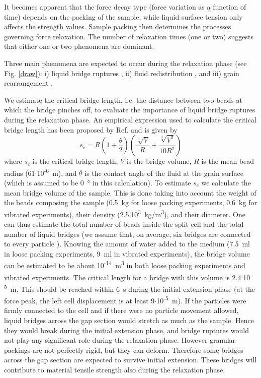 It becomes apparent that the force decay type (force variation as a function of time) depends on the packing of the sample, while liquid surface tension only affects the strength values. Sample packing then determines the processes governing force relaxation. The number of relaxation times (one or two) suggests that either one or two phenomena are dominant.

Three main phenomena are expected to occur during the relaxation phase (see Fig. \ref{draw}): i) liquid bridge ruptures \cite{Kohonen2004,Willett2000}, ii) fluid redistribution \cite{Herminghaus2005,Kohonen2004,Mani2015,Scheel2009,Scheel2008JP}, and iii) grain rearrangement \cite{Hartley2003,Utter2004}.

We estimate the critical bridge length, i.e. the distance between two beads at which the bridge pinches off, to evaluate the importance of liquid bridge ruptures during the relaxation phase. An empirical expression used to calculate the critical bridge length has been proposed by Ref. \cite{Willett2000} and is given by
\begin{equation}\label{sc}
\displaystyle s_c=R\left(1+\frac{\theta}{2}\right)\left(\frac{\sqrt[3]{V}}{R}+\frac{\sqrt[3]{V^2}}{10R^2}\right)
\end{equation}
where $s_c$ is the critical bridge length, $V$ is the bridge volume, $R$ is the mean bead radius (61$\cdot$10\textsuperscript{-6}~\si{\metre}), and $\theta$ is the contact angle of the fluid at the grain surface (which is assumed to be 0~\si{\degree} in this calculation). To estimate $s_c$ we calculate the mean bridge volume of the sample. This is done taking into account the weight of the beads composing the sample (0.5~\si{kg} for loose packing experiments, 0.6~\si{kg} for vibrated experiments), their density (2.5$\cdot$10\textsuperscript{3}~\si{kg/m^3}), and their diameter. One can thus estimate the total number of beads inside the split cell and the total number of liquid bridges (we assume that, on average, six bridges are connected to every particle \cite{Kohonen2004}). Knowing the amount of water added to the medium (7.5~\si{ml} in loose packing experiments, 9~\si{ml} in vibrated experiments), the bridge volume can be estimated to be about 10\textsuperscript{-14}~\si{m^3} in both loose packing experiments and vibrated experiments. The critical length for a bridge with this volume is 2.4$\cdot$10\textsuperscript{-5}~\si{\metre}. This should be reached within 6~\si{s} during the initial extension phase (at the force peak, the left cell displacement is at least 9$\cdot$10\textsuperscript{-5}~\si{\metre}). If the particles were firmly connected to the cell and if there were no particle movement allowed, liquid bridges across the gap section would stretch as much as the sample. Hence they would break during the initial extension phase, and bridge ruptures would not play any significant role during the relaxation phase. However granular packings are not perfectly rigid, but they can deform. Therefore some bridges across the gap section are expected to survive initial extension. These bridges will contribute to material tensile strength also during the relaxation phase.

